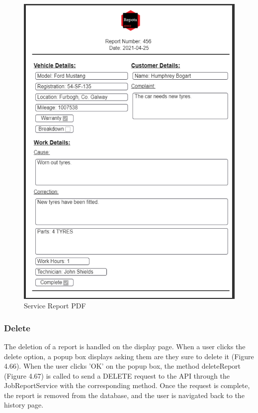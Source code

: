 \begin{figure}[H]
    \centering
    \caption{Service Report PDF}
    \label{image:reportPDF}
    \includegraphics[width=1.0\textwidth]{images/repota/service_report_pdf.png}
\end{figure}

\subsubsection{Delete}
The deletion of a report is handled on the display page. When a user clicks the delete option, a popup box displays asking them are they sure to delete it (Figure 4.66). When the user clicks 'OK' on the popup box, the method deleteReport (Figure 4.67) is called to send a DELETE request to the API through the JobReportService with the corresponding method. Once the request is complete, the report is removed from the database, and the user is navigated back to the history page.

